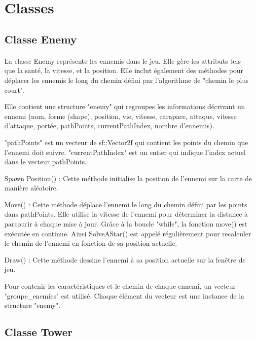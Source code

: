 \documentclass{article}
\begin{document}
\section{Classes}

\subsection{Classe Enemy}
\paragraph{}
La classe Enemy représente les ennemis dans le jeu. Elle gère les attributs tels que la santé, la vitesse, et la position. Elle inclut également des méthodes pour déplacer les ennemis le long du chemin défini par l'algorithme de "chemin le plus court".

Elle contient une structure "enemy" qui regroupes les informations décrivant un ennemi (nom, forme (shape), position, vie, vitesse, carapace, attaque, vitesse d'attaque, portée, pathPoints, currentPathIndex, nombre d'ennemis).


"pathPoints" est un vecteur de sf::Vector2f qui contient les points du chemin que l'ennemi doit suivre. "currentPathIndex" est un entier qui indique l'index actuel dans le vecteur pathPoints.


Spawn Position() : Cette méthode initialise la position de l'ennemi sur la carte de manière aléatoire.

Move() : Cette méthode déplace l'ennemi le long du chemin défini par les points dans pathPoints. Elle utilise la vitesse de l'ennemi pour déterminer la distance à parcourir à chaque mise à jour.
Grâce à la boucle "while", la fonction move() est exécutée en continue. Ainsi SolveAStar() est appelé régulièrement pour recalculer le chemin de l'ennemi en fonction de sa position actuelle.


Draw() : Cette méthode dessine l'ennemi à sa position actuelle sur la fenêtre de jeu.


Pour contenir les caractéristiques et le chemin de chaque ennemi, un vecteur "groupe\_enemies" est utilisé. Chaque élément du vecteur est une instance de la structure "enemy".


\subsection{Classe Tower}
\paragraph{}
\end{document}
